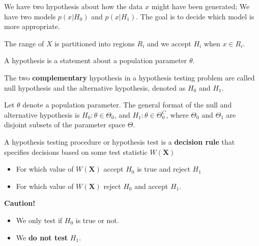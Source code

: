\begin{refsection}
\begin{mdframed}
	We have two hypothesis about how the data $x$ might have been generated; We have two models $p(x|H_0)$ and $p(x|H_1)$. The goal is to decide which model is more appropriate.
	
	
	
\end{mdframed}


\begin{definition}
	The range of $X$ is partitioned into regions $R_i$ and we accept $H_i$ when $x\in R_i$. 
\end{definition}


\begin{definition}[hypothesis]
	\cite[371]{casella2002statistical} A hypothesis is a statement about a population parameter $\theta$.
\end{definition}

\begin{definition}
	The two \textbf{complementary} hypothesis in a hypothesis testing problem are called null hypothesis and the alternative hypothesis, denoted as $H_0$ and $H_1$.
\end{definition}

\begin{remark}
	Let $\theta$ denote a population parameter. The general format of the null and alternative hypothesis is $H_0:\theta \in \Theta_0$, and $H_1:\theta \in\Theta_0^C$, where $\Theta_0$ and $\Theta_1$  are disjoint subsets of the parameter space $\Theta$.
\end{remark}

\begin{definition}
	A hypothesis testing procedure or hypothesis test is a \textbf{decision rule} that specifies decisions based on some test statistic $W(\bm{X})$
	\begin{itemize}
		\item For which value of $W(\bm{X})$ accept $H_0$ is true and reject $H_1$
		\item For which value of $W(\bm{X})$  reject $H_0$ and accept $H_1$.
	\end{itemize}
\end{definition}

\begin{mdframed}
	\textbf{Caution!}
	\begin{itemize}
		\item We only test if $H_0$ is true or not.
		\item We \textbf{do not test }$H_1$.
	\end{itemize}
\end{mdframed}


\end{refsection}
